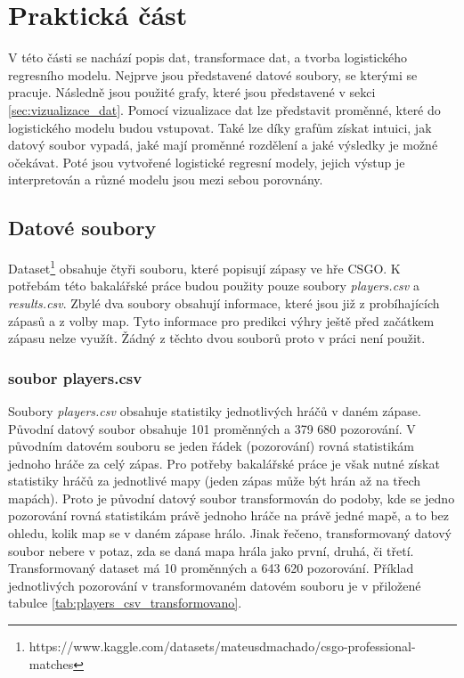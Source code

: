 \chapter{Praktická část}

V této části se nachází popis dat, transformace dat, a tvorba logistického regresního modelu. Nejprve jsou představené datové soubory,
se kterými se pracuje. Následně jsou použité grafy, které jsou představené v sekci \ref{sec:vizualizace_dat}. Pomocí vizualizace dat lze představit proměnné, které
do logistického modelu budou vstupovat. Také lze díky grafům získat intuici, jak datový soubor vypadá, jaké mají proměnné rozdělení a jaké výsledky je možné očekávat.
Poté jsou vytvořené logistické regresní modely, jejich výstup je interpretován a různé modelu jsou mezi sebou porovnány.

\section{Datové soubory}
Dataset\footnote{https://www.kaggle.com/datasets/mateusdmachado/csgo-professional-matches} obsahuje čtyři souboru, které popisují zápasy ve hře
\ac{CSGO}. K potřebám této bakalářské práce budou použity pouze soubory \textit{players.csv} a \textit{results.csv}. Zbylé dva soubory obsahují
informace, které jsou již z probíhajících zápasů a z volby map. Tyto informace pro predikci výhry ještě před začátkem zápasu nelze využít. Žádný z těchto
dvou souborů proto v práci není použit.

\subsection{soubor players.csv}
Soubory \textit{players.csv} obsahuje statistiky jednotlivých hráčů v daném zápase. Původní datový soubor obsahuje 101 proměnných a 379 680 pozorování.
V původním datovém souboru se jeden řádek (pozorování) rovná statistikám jednoho hráče za celý zápas. Pro potřeby bakalářské práce je však nutné získat statistiky hráčů
za jednotlivé mapy (jeden zápas může být hrán až na třech mapách). Proto je původní datový soubor transformován do podoby, kde se jedno pozorování rovná statistikám
právě jednoho hráče na právě jedné mapě, a to bez ohledu, kolik map se v daném zápase hrálo. Jinak řečeno, transformovaný datový soubor nebere v potaz, zda
se daná mapa hrála jako první, druhá, či třetí.
Transformovaný dataset má 10 proměnných a 643 620 pozorování. Příklad jednotlivých pozorování v transformovaném
datovém souboru je v přiložené tabulce \ref{tab:players_csv_transformovano}.


